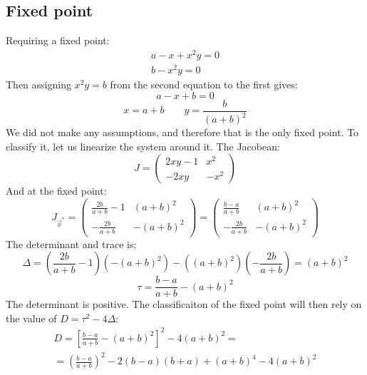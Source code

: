 \documentclass{article}
\begin{document}
\subsection{Fixed point}
Requiring a fixed point:
\begin{equation}
\begin{gathered}
    a - x + x^2y = 0
    \\
    b - x^2y = 0
\end{gathered}
\end{equation}
Then assigning $x^2y = b$ from the second equation to the first gives:
\begin{equation}
    a - x + b = 0
\end{equation}
\begin{equation}
    x = a + b
    \qquad
    y = \frac{b}{(a + b)^2}
\end{equation}
We did not make any assumptions, and therefore that is the only fixed point. To classify it, let us linearize the system around it. The Jacobean:
\begin{equation}
    J = \begin{pmatrix}
        2xy - 1 & x^2 \\ -2xy & -x^2
    \end{pmatrix}
\end{equation}
And at the fixed point:
\begin{equation}
    J_{\vec{x}^*} = \begin{pmatrix}
        \frac{2b}{a + b} - 1 & (a + b)^2 \\ -\frac{2b}{a + b} & -(a + b)^2
    \end{pmatrix} = \begin{pmatrix}
        \frac{b - a}{a + b} & (a + b)^2 \\ -\frac{2b}{a + b} & -(a + b)^2
    \end{pmatrix}
\end{equation}
The determinant and trace is:
\begin{equation}
    \Delta = \left(\frac{2b}{a + b} - 1\right)\left(-(a + b)^2\right) - \left((a + b)^2\right)\left(-\frac{2b}{a + b}\right) = (a + b)^2
\end{equation}
\begin{equation}
    \tau = \frac{b - a}{a + b} - (a + b)^2 
\end{equation}
The determinant is positive. The classificaiton of the fixed point will then rely on the value of $D = \tau^2 - 4\Delta$:
\begin{equation}
\begin{gathered}
    D = \left[\frac{b - a}{a + b} - (a + b)^2 \right]^2 - 4 (a + b)^2 = \\ =
    \left(\frac{b - a}{a + b}\right)^2 - 2(b - a)(b + a) + (a + b)^4 - 4(a + b)^2
\end{gathered}
\end{equation}
\end{document}
